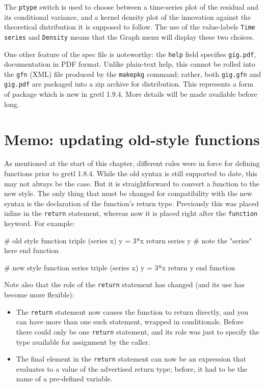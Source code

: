 The \texttt{ptype} switch is used to choose between a time-series plot
of the residual and its conditional variance, and a kernel density
plot of the innovation against the theoretical distribution it is
supposed to follow. The use of the value-labels \texttt{Time series}
and \texttt{Density} means that the \textsf{Graph} menu will display
these two choices.

One other feature of the  spec file is noteworthy: the
\texttt{help} field specifies \texttt{gig.pdf}, documentation in PDF
format. Unlike plain-text help, this cannot be rolled into the
\texttt{gfn} (XML) file produced by the \texttt{makepkg} command;
rather, both \texttt{gig.gfn} and \texttt{gig.pdf} are packaged into a
zip archive for distribution. This represents a form of package
which is new in gretl 1.9.4. More details will be made
available before long. 

\section{Memo: updating old-style functions}
\label{sec:old-func}

As mentioned at the start of this chapter, different rules were in
force for defining functions prior to gretl 1.8.4. While the old
syntax is still supported to date, this may not always be the
case. But it is straightforward to convert a function to the new
style. The only thing that must be changed for compatibility with the
new syntax is the declaration of the function's return
type. Previously this was placed inline in the \texttt{return}
statement, whereas now it is placed right after the \texttt{function}
keyword. For example:
%
\begin{code}
# old style
function triple (series x)
  y = 3*x
  return series y # note the "series" here
end function

# new style
function series triple (series x)
  y = 3*x
  return y
end function
\end{code}

Note also that the role of the \texttt{return} statement has changed
(and its use has become more flexible):

\begin{itemize}
\item The \texttt{return} statement now causes the function to return
  directly, and you can have more than one such statement, wrapped in
  conditionals. Before there could only be one \texttt{return}
  statement, and its role was just to specify the type available for
  assignment by the caller.
\item The final element in the \texttt{return} statement can now be an
  expression that evaluates to a value of the advertised return type;
  before, it had to be the name of a pre-defined variable.
\end{itemize}



